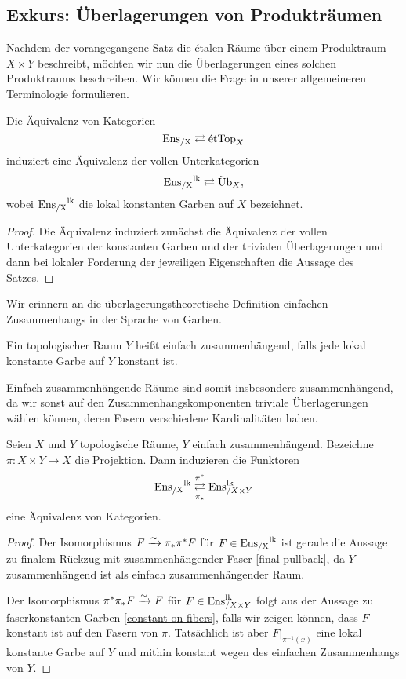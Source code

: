 \subsection{Exkurs: Überlagerungen von Produkträumen}

Nachdem der vorangegangene Satz die étalen Räume über einem
Produktraum $X \times Y$ beschreibt, möchten wir nun die
Überlagerungen eines solchen Produktraums beschreiben. Wir können die
Frage in unserer allgemeineren Terminologie formulieren.
\begin{prop}
  Die Äquivalenz von Kategorien
  \[ \operatorname{Ens_{/X}} \rightleftarrows \mathrm{\acute{e}tTop}_X \]
  induziert eine Äquivalenz der vollen Unterkategorien
  \[ \operatorname{Ens_{/X}}^{\operatorname{lk}} \rightleftarrows \mathrm{\ddot{U}b}_X, \]
  wobei $\operatorname{Ens_{/X}}^{\operatorname{lk}}$ die lokal konstanten Garben auf $X$ bezeichnet.
\end{prop}
\begin{proof}
  Die Äquivalenz induziert zunächst die Äquivalenz der vollen
  Unterkategorien der konstanten Garben und der trivialen
  Überlagerungen und dann bei lokaler Forderung der jeweiligen
  Eigenschaften die Aussage des Satzes.
\end{proof}

Wir erinnern an die überlagerungstheoretische Definition einfachen
Zusammenhangs in der Sprache von Garben.
\begin{defn}
  Ein topologischer Raum $Y$ heißt einfach zusammenhängend, falls jede
  lokal konstante Garbe auf $Y$ konstant ist.
\end{defn}
Einfach zusammenhängende Räume sind somit insbesondere
zusammenhängend, da wir sonst auf den Zusammenhangskomponenten
triviale Überlagerungen wählen können, deren Fasern verschiedene
Kardinalitäten haben.

\begin{satz}
  Seien $X$ und $Y$ topologische Räume, $Y$ einfach
  zusammenhängend. Bezeichne $\pi: X \times Y \to X$ die
  Projektion. Dann induzieren die Funktoren
  \[ \operatorname{Ens_{/X}}^{\operatorname{lk}}
  \mathrel{\mathop{\rightleftarrows}^{\pi^*}_{\pi_*}}
  \operatorname{Ens}_{/X \times Y}^{\operatorname{lk}} \]
  eine Äquivalenz von Kategorien.
\end{satz}
\begin{proof}
  Der Isomorphismus $F \xrightarrow[]{\sim} \pi_* \pi^* F$ für $F \in \operatorname{Ens_{/X}}^{\operatorname{lk}}$ ist
  gerade die Aussage zu finalem Rückzug mit zusammenhängender Faser
  \ref{final-pullback}, da $Y$ zusammenhängend ist als einfach
  zusammenhängender Raum.

  Der Isomorphismus $\pi^* \pi_* F \xrightarrow[]{\sim} F$ für $F \in \operatorname{Ens}_{/X \times
    Y}^{\operatorname{lk}}$ folgt aus der Aussage zu faserkonstanten Garben
  \ref{constant-on-fibers}, falls wir zeigen können, dass $F$ konstant
  ist auf den Fasern von $\pi$. Tatsächlich ist aber
  $F|_{\pi^{-1}(x)}$ eine lokal konstante Garbe auf $Y$ und mithin
  konstant wegen des einfachen Zusammenhangs von $Y$.
\end{proof}

